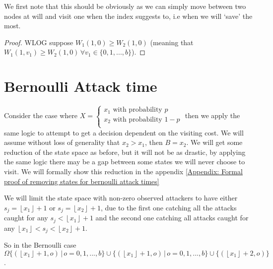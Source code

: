 \documentclass[a4paper,10pt]{article}
\newcommand{\floor}[1]{\left \lfloor #1 \right \rfloor}
\theoremstyle{definition}
\theoremstyle{definition}
\theoremstyle{remark}
\theoremstyle{definition}
\begin{document}
We first note that this should be obviously as we can simply move between two nodes at will and visit one when the index suggests to, i.e when we will `save' the most.

\begin{proof}
WLOG suppose $W_{1}(1,0) \geq W_{2}(1,0)$ (meaning that $W_{1}(1,v_{1}) \geq W_{2}(1,0) \, \forall v_{1} \in \{0,1,...,b \}$).
\end{proof}

\section{Bernoulli Attack time}
Consider the case where $X=\begin{cases}
x_{1} \text{ with probability } p \\
x_{2} \text{ with probability } 1-p \\
\end{cases}$ then we apply the same logic to attempt to get a decision dependent on the visiting cost. We will assume without loss of generality that $x_{2} > x_{1}$, then $B=x_{2}$. We will get some reduction of the state space as before, but it will not be as drastic, by applying the same logic there may be a gap between some states we will never choose to visit.
We will formally show this reduction in the appendix \ref{Appendix: Formal proof of removing states for bernoulli attack times}

We will limit the state space with non-zero observed attackers to have either $s_{j}=\floor{x_{1}}+1$ or $s_{j}=\floor{x_{2}}+1$, due to the first one catching all the attacks caught for any $s_{j}<\floor{x_{1}}+1$ and the second one catching all attacks caught for any $\floor{x_{1}}<s_{j}<\floor{x_{2}}+1$.

So in the Bernoulli case $\Omega \{(\floor{x_{1}}+1,o) \, | \, o=0,1,...,b \} \cup \{(\floor{x_{1}}+1,o) \, | \, o=0,1,...,b \} \cup \{(\floor{x_{1}}+2,o) \}$.
\end{document}
